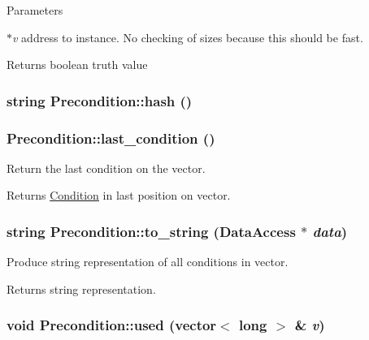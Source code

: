 \begin{DoxyParams}{Parameters}
\item[{\em $\ast$v}]address to instance. No checking of sizes because this should be fast. \end{DoxyParams}
\begin{DoxyReturn}{Returns}
boolean truth value 
\end{DoxyReturn}
\hypertarget{classPrecondition_a58cb7a26042379e7d7f32019c0086f8b}{
\subsubsection[{hash}]{\setlength{\rightskip}{0pt plus 5cm}string Precondition::hash ()}}
\label{classPrecondition_a58cb7a26042379e7d7f32019c0086f8b}
\hypertarget{classPrecondition_a0dc149f6a94c23abf08a226fe922e45a}{
\subsubsection[{last\_\-condition}]{ Precondition::last\_\-condition ()}}
\label{classPrecondition_a0dc149f6a94c23abf08a226fe922e45a}
Return the last condition on the vector.

\begin{DoxyReturn}{Returns}
\hyperlink{classCondition}{Condition} in last position on vector. 
\end{DoxyReturn}
\hypertarget{classPrecondition_aedde69bd1559732cfefeb4160c1b184d}{
\subsubsection[{to\_\-string}]{\setlength{\rightskip}{0pt plus 5cm}string Precondition::to\_\-string ({\bf DataAccess} $\ast$ {\em data})}}
\label{classPrecondition_aedde69bd1559732cfefeb4160c1b184d}
Produce string representation of all conditions in vector.

\begin{DoxyReturn}{Returns}
string representation. 
\end{DoxyReturn}
\hypertarget{classPrecondition_aec5f3333fee9d0d068f2d097d9c2f699}{
\subsubsection[{used}]{\setlength{\rightskip}{0pt plus 5cm}void Precondition::used (vector$<$ long $>$ \& {\em v})}}
\label{classPrecondition_aec5f3333fee9d0d068f2d097d9c2f699}



